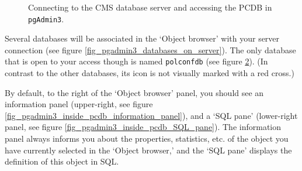 \begin{figure}[ht!]
\begin{subfigure}{.45\textwidth}
    \label{fig_pgadmin3_inside_pcdb}
  \end{subfigure} 
  \caption{Connecting to the CMS database server and accessing the PCDB in \texttt{pgAdmin3}.}
\end{figure}

Several databases will be associated in the `Object browser' with your server connection (see figure \ref{fig_pgadmin3_databases_on_server}).
The only database that is open to your access though is named \texttt{\footnotesize polconfdb} (see figure \ref{fig_pgadmin3_inside_pcdb}). (In contrast to the other databases, its icon is not visually marked with a red cross.) 

By default, to the right of the `Object browser' panel, you should see an information panel (upper-right, see figure \ref{fig_pgadmin3_inside_pcdb_information_panel}), and a `SQL pane' (lower-right panel, see figure \ref{fig_pgadmin3_inside_pcdb_SQL_pane}). 
The information panel always informs you about the properties, statistics, etc. of the object you have currently selected in the `Object browser,' and the `SQL pane' displays the definition of this object in SQL.

